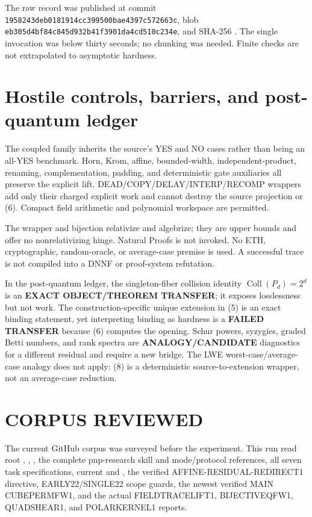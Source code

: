 \documentclass[11pt]{article}
\begin{document}
The raw record
was published at commit
{\footnotesize\texttt{1958243deb0181914cc399500bae4397c572663c}}, blob
{\footnotesize\texttt{eb305d4bf84c845d932b41f3901da4cd510c234e}}, and SHA-256
{\footnotesize\texttt{}}.
The single invocation was below thirty seconds; no chunking was needed.
Finite checks are not extrapolated to asymptotic hardness.

\section{Hostile controls, barriers, and post-quantum ledger}
The coupled family inherits the source's YES and NO cases rather than being
an all-YES benchmark.  Horn, Krom, affine, bounded-width, independent-product,
renaming, complementation, padding, and deterministic gate auxiliaries all
preserve the explicit lift.  DEAD/COPY/DELAY/INTERP/RECOMP wrappers add only
their charged explicit work and cannot destroy the source projection or (6).
Compact field arithmetic and polynomial workspace are permitted.

The wrapper and bijection relativize and algebrize; they are upper bounds and
offer no nonrelativizing hinge.  Natural Proofs is not invoked.  No ETH,
cryptographic, random-oracle, or average-case premise is used.  A successful
trace is not compiled into a DNNF or proof-system refutation.

In the post-quantum ledger, the singleton-fiber collision identity
$\operatorname{Coll}(P_d)=2^d$ is an \textbf{EXACT OBJECT/THEOREM TRANSFER};
it exposes losslessness but not work.  The construction-specific unique
extension in (5) is an exact binding statement, yet interpreting binding as
hardness is a \textbf{FAILED TRANSFER} because (6) computes the opening.
Schur powers, syzygies, graded Betti numbers, and rank spectra are
\textbf{ANALOGY/CANDIDATE} diagnostics for a different residual and require a
new bridge.  The LWE worst-case/average-case analogy does not apply: (8) is a
deterministic source-to-extension wrapper, not an average-case reduction.

\section{CORPUS REVIEWED}
The current GitHub corpus was surveyed before the experiment.  This run read
root , , , the complete
pnp-research skill and mode/protocol references, all seven task
specifications, current  and , the verified
AFFINE-RESIDUAL-REDIRECT1 directive, EARLY22/SINGLE22 scope guards, the newest
verified MAIN CUBEPERMFW1, and the actual FIELDTRACELIFT1, BIJECTIVEQFW1,
QUADSHEAR1, and POLARKERNEL1 reports.
\end{document}
